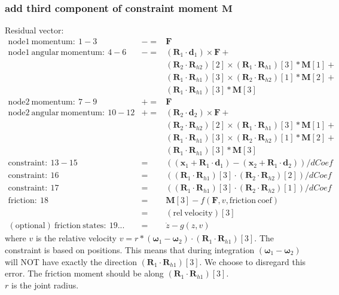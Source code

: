 \documentclass[10pt,dvips]{report}
\newcommand{\T}[1]{\boldsymbol{#1}}
\begin{document}
\subsubsection{add third component of constraint moment $\T M$}
Residual vector:
\begin{eqnarray*}
	\mathrm{node1\ momentum}:\ 1-3& -= & \T F\\
	\mathrm{node1\ angular\ momentum}:\ 4-6& -= & 
		(\T R_1\cdot \T d_1) \times \T F + \\
	&&	(\T R_2\cdot \T R_{h2})[2]\times 
		(\T R_1\cdot \T R_{h1})[3]*\T M[1] +\\
	&&	(\T R_1\cdot \T R_{h1})[3]\times
		(\T R_2\cdot \T R_{h2})[1]*\T M[2] +\\
	&&	(\T R_1\cdot \T R_{h1})[3]*\T M[3]\\
	\mathrm{node2\ momentum}:\ 7-9& += & \T F\\
	\mathrm{node2\ angular\ momentum}:\ 10-12& += & 
		(\T R_2\cdot \T d_2) \times \T F + \\
	&&	(\T R_2\cdot \T R_{h2})[2]\times 
		(\T R_1\cdot \T R_{h1})[3]*\T M[1] +\\
	&&	(\T R_1\cdot \T R_{h1})[3]\times
		(\T R_2\cdot \T R_{h2})[1]*\T M[2] +\\
	&&	(\T R_1\cdot \T R_{h1})[3]*\T M[3]\\
	\mathrm{constraint}:\ 13-15& = &  ((\T x_1+\T R_1\cdot \T d_1) - 
			(\T x_2+\T R_1\cdot \T d_2))/dCoef\\
	\mathrm{constraint}:\ 16& = &  ((\T R_1\cdot \T R_{h1})[3]\cdot 
			(\T R_2\cdot \T R_{h2})[2])/dCoef\\
	\mathrm{constraint}:\ 17& = &  ((\T R_1\cdot \T R_{h1})[3]\cdot 
			(\T R_2\cdot \T R_{h2})[1])/dCoef\\
	\mathrm{friction:}\ 18& = &  \T M[3] -f(\T F, v, 
			\mathrm{friction\ coef})\\
		& = &  (\mathrm{rel\ velocity})[3]\\
	\mathrm{(optional)\ friction\ states:}\ 19...& = &  \dot{z} - g(z,v)
\end{eqnarray*}
where $v$ is the relative velocity
$v = r * (\T \omega_{1}-\T \omega_{2})\cdot(\T R_1\cdot \T R_{h1})[3]$.
The constraint is based on positions. This means that during integration 
$(\T \omega_{1}-\T \omega_{2})$ will NOT have exactly the
direction $(\T R_1\cdot \T R_{h1})[3]$. We choose to disregard this error.
The friction moment should be along $(\T R_1\cdot \T R_{h1})[3]$.\\
$r$ is the joint radius.\\
\end{document}
